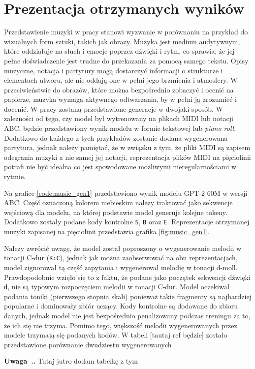 \documentclass[data-science]{agh-wi} %
\newcounter{comment}[chapter]
\newenvironment{comment}[1][]{\begin{shaded}\refstepcounter{comment}
\noindent \textbf{Uwaga~\thechapter.\thecomment. #1} \rmfamily}{\end{shaded}}
\begin{document}
\section{Prezentacja otrzymanych wyników}
Przedstawienie muzyki w pracy stanowi wyzwanie w porównaniu na przykład do wizualnych form sztuki, takich jak obrazy. Muzyka jest medium audytywnym, które oddziałuje na słuch i emocje poprzez dźwięki i rytm, co sprawia, że jej pełne doświadczenie jest trudne do przekazania za pomocą samego tekstu. Opisy muzyczne, notacja i partytury mogą dostarczyć informacji o strukturze i elementach utworu, ale nie oddają one w pełni jego brzmienia i atmosfery. W przeciwieństwie do obrazów, które można bezpośrednio zobaczyć i ocenić na papierze, muzyka wymaga aktywnego odtwarzania, by w pełni ją zrozumieć i docenić. W pracy zostaną przedstawione generacje w dwojaki sposób. W zależności od tego, czy model był wytrenowany na plikach MIDI lub notacji ABC, będzie przedstawiony wynik modelu w formie tekstowej lub \textit{piano roll}. Dodatkowo do każdego z tych przykładów zostanie dodana wygenerowana partytura, jednak należy pamiętać, że w związku z tym, że pliki MIDI są zapisem odegrania muzyki a nie samej jej notacji, reprezentacja plików MIDI na pięciolinii potrafi nie być idealna co jest spowodowane możliwymi nieregularnościami w rytmie.

Na grafice \ref*{code:music_gen1} przedstawiono wynik modelu GPT-2 60M w wersji ABC. Część oznaczoną kolorem niebieskim należy traktować jako sekwencje wejściową dla modelu, na której podstawie model generuje kolejne tokeny. Dodatkowo zostały podane kody kontrolne \texttt{S}, \texttt{B} oraz \texttt{E}. Reprezentacje otrzymanej muzyki zapisanej na pięciolinii przedstawia grafika \ref*{fig:music_gen1}.

Należy zwrócić uwagę, że model został poproszony o wygenerowanie melodii w tonacji C-dur (\texttt{K:C}), jednak jak można zaobserwować na obu reprezentacjach, model zignorował tą część zapytania i wygenerował melodię w tonacji d-moll. Prawdopodobnie wzięło się to z faktu, że podane jako początek sekwencji dźwięki \texttt{d}, nie są typowym rozpoczęciem melodii w tonacji C-dur. Model oczekiwał podania toniki (pierwszego stopnia skali) ponieważ takie fragmenty są najbardziej popularne i dominowały zbiór uczący. Kody kontrolne są dodawane do zbioru danych, jednak model nie jest bezpośrednio penalizowany podczas treningu za to, że ich się nie trzyma. Pomimo tego, większość melodii wygenerowanych przez modele trzymają się podanych kodów. W tabeli [tautaj ref będzie] zostało przedstawione porównanie dwudziestu wygenerowanych 
\begin{comment}
Tutaj jutro dodam tabelkę z tym 
\end{comment}
\end{document}
